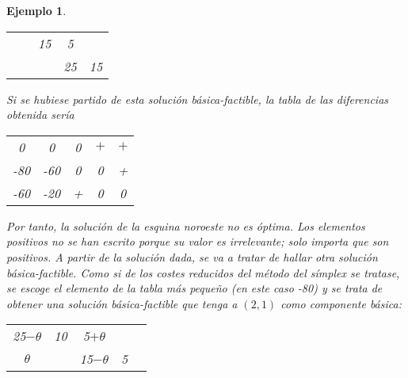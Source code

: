 \documentclass[11pt]{report}
\theoremstyle{mytheorem}
\theoremstyle{mydefinition}
\theoremstyle{myexample}
\newtheorem*{example}{Ejemplo}
\begin{document}
\begin{example}
\begin{center}
\begin{tabular}{ccccc}
    \multicolumn{1}{|c}{} & \multicolumn{1}{c}{} & \multicolumn{1}{c}{15} &  \multicolumn{1}{c}{5} & \multicolumn{1}{c|}{} \\
    
    \multicolumn{1}{|c}{} & \multicolumn{1}{c}{} & \multicolumn{1}{c}{} &  \multicolumn{1}{c}{25} & \multicolumn{1}{c|}{15} \\[2pt] \cline{1-5}
\end{tabular}
\end{center}
Si se hubiese partido de esta solución básica-factible, la tabla de las diferencias obtenida sería
\begin{center}
\setlength\extrarowheight{2pt}
\begin{tabular}{ccccc}
    \cline{1-5}

    \multicolumn{1}{|c}{0} & \multicolumn{1}{c}{0} & \multicolumn{1}{c}{0} &  \multicolumn{1}{c}{$+$} & \multicolumn{1}{c|}{$+$} \\

    \multicolumn{1}{|c}{-80} & \multicolumn{1}{c}{-60} & \multicolumn{1}{c}{0} &  \multicolumn{1}{c}{0} & \multicolumn{1}{c|}{+} \\
    
    \multicolumn{1}{|c}{-60} & \multicolumn{1}{c}{-20} & \multicolumn{1}{c}{+} &  \multicolumn{1}{c}{0} & \multicolumn{1}{c|}{0} \\[2pt] \cline{1-5}
\end{tabular}
\end{center}
Por tanto, la solución de la esquina noroeste no es óptima. Los elementos positivos no se han escrito porque su valor es irrelevante; solo importa que son positivos. A partir de la solución dada, se va a tratar de hallar otra solución básica-factible. Como si de los costes reducidos del método del símplex se tratase, se escoge el elemento de la tabla más pequeño (en este caso -80) y se trata de obtener una solución básica-factible que tenga a $(2,1)$ como componente básica:
\begin{center}
\setlength\extrarowheight{2pt}
\begin{tabular}{ccccc}
    \cline{1-5}

    \multicolumn{1}{|c}{25$-\theta$} & \multicolumn{1}{c}{10} & \multicolumn{1}{c}{5$+\theta$} &  \multicolumn{1}{c}{} & \multicolumn{1}{c|}{} \\

    \multicolumn{1}{|c}{$\theta$} & \multicolumn{1}{c}{} & \multicolumn{1}{c}{15$-\theta$} &  \multicolumn{1}{c}{5} & \multicolumn{1}{c|}{} \\
    

\end{tabular}
\end{center}
\end{example}
\end{document}
